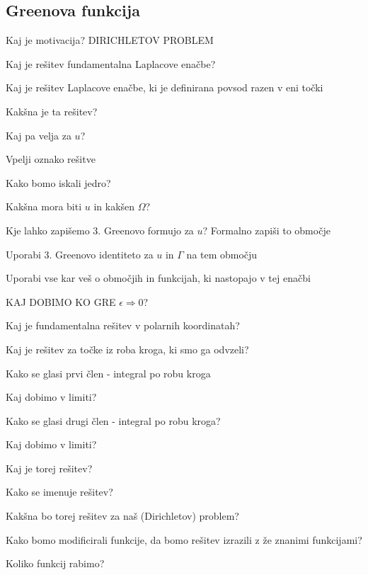 \documentclass{article}
\begin{document}
    \subsection{Greenova funkcija}
    \begin{enumerate}
        \item Kaj je motivacija?
        DIRICHLETOV PROBLEM
        {\color{red}\item Kaj je rešitev fundamentalna Laplacove enačbe?}
        {\color{red}\item Kaj je rešitev Laplacove enačbe, ki je definirana povsod razen v eni točki}
        {\color{red}\item Kakšna je ta rešitev?}
        {\color{red}\item Kaj pa velja za $u$?}
        \item Vpelji oznako rešitve
        {\color{red}\item Kako bomo iskali jedro?}
        {\color{red}\item Kakšna mora biti $u$ in kakšen $\Omega$?}
        {\color{red}\item Kje lahko zapišemo 3. Greenovo formujo za $u$? Formalno zapiši to območje}
        \item Uporabi 3. Greenovo identiteto za $u$ in $\Gamma$ na tem območju
        {\color{red}\item Uporabi vse kar veš o območjih in funkcijah, ki nastopajo v tej enačbi}
        KAJ DOBIMO KO GRE $\epsilon \Rightarrow 0$?
        \item Kaj je fundamentalna rešitev v polarnih koordinatah?
        \item Kaj je rešitev za točke iz roba kroga, ki smo ga odvzeli?
        {\color{red}\item Kako se glasi prvi člen - integral po robu kroga}
        \item Kaj dobimo v limiti?
        {\color{red}\item Kako se glasi drugi člen - integral po robu kroga?}
        \item Kaj dobimo v limiti?
        \item Kaj je torej rešitev?
        {\color{red}\item Kako se imenuje rešitev?}
        {\color{red}\item Kakšna bo torej rešitev za naš (Dirichletov) problem?}
        \item Kako bomo modificirali funkcije, da bomo rešitev izrazili z že znanimi funkcijami?
        \item Koliko funkcij rabimo?

\end{enumerate}
\end{document}
